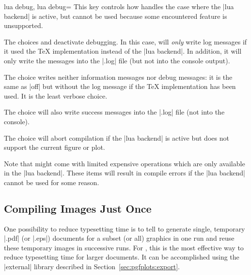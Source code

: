 {\begin{pgfplotskeylist}{%
    lua debug,
    lua debug=%
}
    This key controls how \PGFPlots{} handles the case where the |lua backend|
    is active, but cannot be used because some encountered feature is
    unsupported.

    The choices  and  deactivate \lua{}
    debugging. In this case, \PGFPlots{} will \emph{only} write log messages if
    it used the \TeX{} implementation instead of the |lua backend|. In
    addition, it will only write the messages into the |.log| file (but not
    into the console output).

    The choice  writes neither information messages
    nor debug messages: it is the same as |off| but without the log message if
    the \TeX{} implementation has been used. It is the least verbose choice.

    The choice  will also write success messages into the
    |.log| file (not into the console).

    The choice  will abort compilation if the
    |lua backend| is active but does not support the current figure or plot.

    Note that \PGFPlots{} might come with limited expensive operations which
    are only available in the |lua backend|. These items will result in compile
    errors if the |lua backend| cannot be used for some reason.
\end{pgfplotskeylist}


\subsection{Compiling Images Just Once}

One possibility to reduce typesetting time is to tell \PGF{} to generate
single, temporary |.pdf| (or |.eps|) documents for a subset (or all) graphics
in one run and reuse these temporary images in successive runs. For
\PGFPlots{}, this is the most effective way to reduce typesetting time for
larger documents. It can be accomplished using the |external| library described
in Section~\ref{sec:pgfplots:export}.

}
